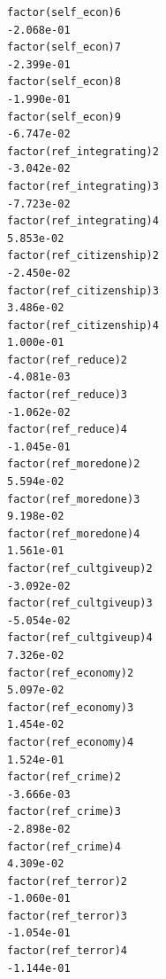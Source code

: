 \documentclass[
]{article}
\begin{document}
\begin{table}
\begin{minipage}[t]{\linewidth}
{\begin{verbatim}
factor(self_econ)6                                                                -2.068e-01
factor(self_econ)7                                                                -2.399e-01
factor(self_econ)8                                                                -1.990e-01
factor(self_econ)9                                                                -6.747e-02
factor(ref_integrating)2                                                          -3.042e-02
factor(ref_integrating)3                                                          -7.723e-02
factor(ref_integrating)4                                                           5.853e-02
factor(ref_citizenship)2                                                          -2.450e-02
factor(ref_citizenship)3                                                           3.486e-02
factor(ref_citizenship)4                                                           1.000e-01
factor(ref_reduce)2                                                               -4.081e-03
factor(ref_reduce)3                                                               -1.062e-02
factor(ref_reduce)4                                                               -1.045e-01
factor(ref_moredone)2                                                              5.594e-02
factor(ref_moredone)3                                                              9.198e-02
factor(ref_moredone)4                                                              1.561e-01
factor(ref_cultgiveup)2                                                           -3.092e-02
factor(ref_cultgiveup)3                                                           -5.054e-02
factor(ref_cultgiveup)4                                                            7.326e-02
factor(ref_economy)2                                                               5.097e-02
factor(ref_economy)3                                                               1.454e-02
factor(ref_economy)4                                                               1.524e-01
factor(ref_crime)2                                                                -3.666e-03
factor(ref_crime)3                                                                -2.898e-02
factor(ref_crime)4                                                                 4.309e-02
factor(ref_terror)2                                                               -1.060e-01
factor(ref_terror)3                                                               -1.054e-01
factor(ref_terror)4                                                               -1.144e-01

\end{verbatim}}
\end{minipage}
\end{table}
\end{document}
